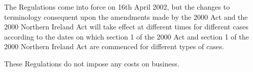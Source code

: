 \documentclass[12pt,a4paper]{article}
\begin{document}
The Regulations come into force on 16th April 2002, but the changes to terminology consequent upon the amendments made by the 2000 Act and the 2000 Northern Ireland Act will take effect at different times for different cases according to the dates on which section 1 of the 2000 Act and section 1 of the 2000 Northern Ireland Act are commenced for different types of cases.

These Regulations do not impose any costs on business. 
\end{document}

